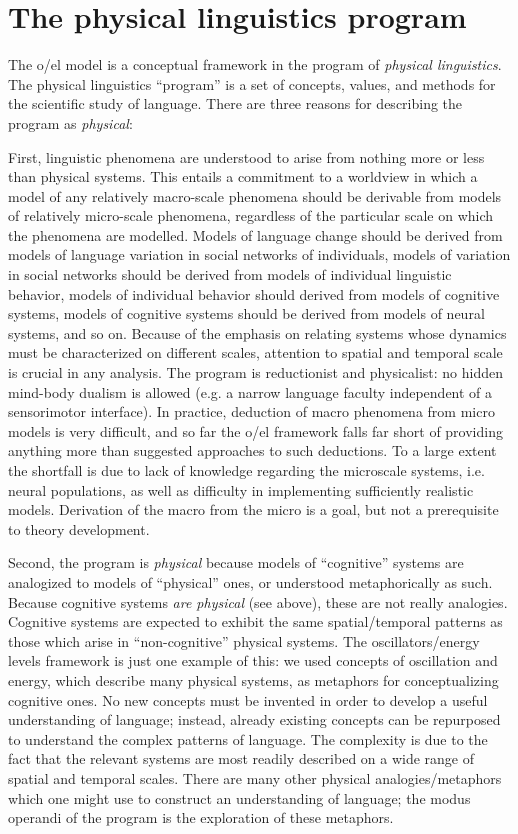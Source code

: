 \chapter{The physical linguistics program}

The o/el model is a conceptual framework in the program of \textit{physical linguistics}. The physical linguistics “program” is a set of concepts, values, and methods for the scientific study of language. There are three reasons for describing the program as \textit{physical}: 

  First, linguistic phenomena are understood to arise from nothing more or less than physical systems. This entails a commitment to a worldview in which a model of any relatively macro-scale phenomena should be derivable from models of relatively micro-scale phenomena, regardless of the particular scale on which the phenomena are modelled. Models of language change should be derived from models of language variation in social networks of individuals, models of variation in social networks should be derived from models of individual linguistic behavior, models of individual behavior should derived from models of cognitive systems, models of cognitive systems should be derived from models of neural systems, and so on. Because of the emphasis on relating systems whose dynamics must be characterized on different scales, attention to spatial and temporal scale is crucial in any analysis. The program is reductionist and physicalist: no hidden mind-body dualism is allowed (e.g. a narrow language faculty independent of a sensorimotor interface). In practice, deduction of macro phenomena from micro models is very difficult, and so far the o/el framework falls far short of providing anything more than suggested approaches to such deductions. To a large extent the shortfall is due to lack of knowledge regarding the microscale systems, i.e. neural populations, as well as difficulty in implementing sufficiently realistic models. Derivation of the macro from the micro is a goal, but not a prerequisite to theory development.

  Second, the program is \textit{physical} because models of “cognitive” systems are analogized to models of “physical” ones, or understood metaphorically as such. Because cognitive systems \textit{are physical} (see above), these are not really analogies. Cognitive systems are expected to exhibit the same spatial/temporal patterns as those which arise in “non-cognitive” physical systems. The oscillators/energy levels framework is just one example of this: we used concepts of oscillation and energy, which describe many physical systems, as metaphors for conceptualizing cognitive ones. No new concepts must be invented in order to develop a useful understanding of language; instead, already existing concepts can be repurposed to understand the complex patterns of language. The complexity is due to the fact that the relevant systems are most readily described on a wide range of spatial and temporal scales. There are many other physical analogies/metaphors which one might use to construct an understanding of language; the modus operandi of the program is the exploration of these metaphors.

